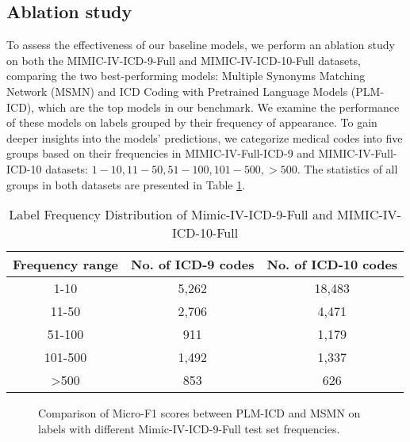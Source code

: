 \documentclass[11pt]{article}
\begin{document}
\subsection{Ablation study}
To assess the effectiveness of our baseline models, we perform an ablation study on both the MIMIC-IV-ICD-9-Full and MIMIC-IV-ICD-10-Full datasets, comparing the two best-performing models: Multiple Synonyms Matching Network (MSMN) and ICD Coding with Pretrained Language Models (PLM-ICD), which are the top models in our benchmark. We examine the performance of these models on labels grouped by their frequency of appearance. To gain deeper insights into the models' predictions, we categorize medical codes into five groups based on their frequencies in MIMIC-IV-Full-ICD-9 and MIMIC-IV-Full-ICD-10 datasets: $1-10, 11-50, 51-100, 101-500, >500$. The statistics of all groups in both datasets are presented in Table \ref{tab: label frequency distribution Mimic-IV-ICD}.
\begin{table}[!t]
\centering
\small
\begin{tabular}{ccc}
\toprule
Frequency range & No. of ICD-9 codes  & No. of ICD-10 codes\\
\midrule
1-10 &5,262 & 18,483 \\
11-50 &2,706 & 4,471 \\
51-100 & 911 & 1,179\\
101-500 & 1,492& 1,337 \\
>500 & 853 & 626\\
\bottomrule
\end{tabular}
\caption{Label Frequency Distribution of Mimic-IV-ICD-9-Full and MIMIC-IV-ICD-10-Full}\label{tab: label frequency distribution Mimic-IV-ICD}
\end{table}
\begin{figure}[!t]


    \caption{Comparison of Micro-F1 scores between PLM-ICD and MSMN on labels with different Mimic-IV-ICD-9-Full test set frequencies.}
    \label{fig:Micro F1 by label frequency group Mimic-IV-ICD-9}
\end{figure}
\end{document}

